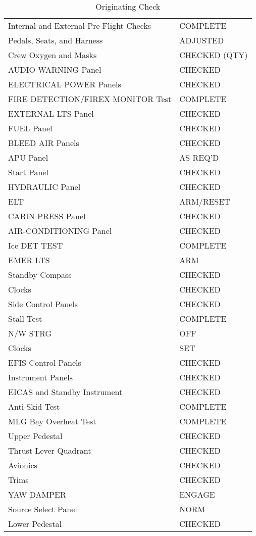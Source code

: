 \begin{table}[htbp]
\begin{minipage}{\linewidth}
\setlength{\tymax}{0.5\linewidth}
\centering
\small
\caption{Originating Check}
\label{originatingcheck}
\begin{tabulary}{\textwidth}{@{}ll@{}} \toprule
\midrule

 Internal and External Pre-Flight Checks & COMPLETE  \\
 Pedals, Seats, and Harness    & ADJUSTED  \\
 Crew Oxygen and Masks     & CHECKED (QTY) \\
 AUDIO WARNING Panel      & CHECKED  \\
 ELECTRICAL POWER Panels     & CHECKED  \\
 FIRE DETECTION\slash FIREX MONITOR Test  & COMPLETE  \\
 EXTERNAL LTS Panel      & CHECKED  \\
 FUEL Panel        & CHECKED  \\
 BLEED AIR Panels      & CHECKED  \\
 APU Panel        & AS REQ'D  \\
 Start Panel        & CHECKED  \\
 HYDRAULIC Panel       & CHECKED  \\
 ELT          & ARM\slash RESET  \\
 CABIN PRESS Panel      & CHECKED  \\
 AIR-CONDITIONING Panel     & CHECKED  \\
 Ice DET TEST       & COMPLETE  \\
 EMER LTS        & ARM   \\
 Standby Compass       & CHECKED  \\
 Clocks         & CHECKED  \\
 Side Control Panels      & CHECKED  \\
 Stall Test        & COMPLETE  \\
 N\slash W STRG        & OFF   \\
 Clocks         & SET   \\
 EFIS Control Panels      & CHECKED  \\
 Instrument Panels      & CHECKED  \\
 EICAS and Standby Instrument   & CHECKED  \\
 Anti-Skid Test       & COMPLETE  \\
 MLG Bay Overheat Test     & COMPLETE  \\
 Upper Pedestal       & CHECKED  \\
 Thrust Lever Quadrant     & CHECKED  \\
 Avionics        & CHECKED  \\
 Trims         & CHECKED  \\
 YAW DAMPER        & ENGAGE  \\
 Source Select Panel      & NORM   \\
 Lower Pedestal       & CHECKED  \\
\bottomrule

\end{tabulary}
\end{minipage}
\end{table}


